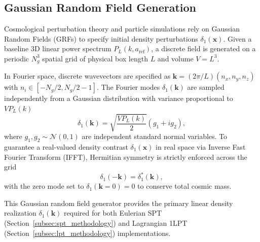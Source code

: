 \subsection{Gaussian Random Field Generation}
\label{subsec:gaussian_fields}

Cosmological perturbation theory and particle simulations rely on Gaussian Random Fields (GRFs) to specify initial density perturbations $\delta_1(\mathbf{x})$. 
Given a baseline 3D linear power spectrum $P_L(k, a_{\mathrm{ref}})$, a discrete field is generated on a periodic $N_g^3$ spatial grid of physical box length $L$ and volume $V = L^3$.

In Fourier space, discrete wavevectors are specified as $\mathbf{k} = (2\pi/L)(n_x, n_y, n_z)$ with $n_i \in [-N_g/2, N_g/2 - 1]$. 
The Fourier modes $\delta_1(\mathbf{k})$ are sampled independently from a Gaussian distribution with variance proportional to $V P_L(k)$
    \begin{equation}
        \delta_1(\mathbf{k}) = \sqrt{\frac{V P_L(k)}{2}} \left( g_1 + i g_2 \right),
        \label{eq:grf_fourier_mode}
    \end{equation}
where $g_1, g_2 \sim \mathcal{N}(0, 1)$ are independent standard normal variables. 
To guarantee a real-valued density contrast $\delta_1(\mathbf{x})$ in real space via Inverse Fast Fourier Transform (IFFT), Hermitian symmetry is strictly enforced across the grid
    \begin{equation}
        \delta_1(-\mathbf{k}) = \delta_1^*(\mathbf{k}),
        \label{eq:hermitian_symmetry}
    \end{equation}
with the zero mode set to $\delta_1(\mathbf{k}=0) = 0$ to conserve total cosmic mass. 

This Gaussian random field generator provides the primary linear density realization $\delta_1(\mathbf{k})$ required for both Eulerian SPT (Section~\ref{subsec:spt_methodology}) and Lagrangian 1LPT (Section~\ref{subsec:lpt_methodology}) implementations.
